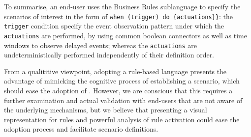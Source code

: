 To summarise, an end-user uses the Business Rules sublanguage to specify the scenarios of interest in the form of \lstinline[language=iotdsl]!when (trigger) do {actuations}}!: the \lstinline[language=iotdsl]{trigger} condition specify the event observation pattern under which the \lstinline[language=iotdsl]{actuations} are performed, by using common boolean connectors as well as time windows to observe delayed events; whereas the \lstinline[language=iotdsl]{actuations} are undeterministically performed independently of their definition order. 

From a qualititive viewpoint, adopting a rule-based language presents the advantage of mimicking the cognitive process of establishing a scenario, which should ease the adoption of \IOTDSL. However, we are conscious that this requires a further examination and actual validation with end-users that are not aware of the underlying \DSL mechanisms, but we believe that presenting a visual representation for rules and powerful analysis of rule activation could ease the adoption process and facilitate scenario definitions.




